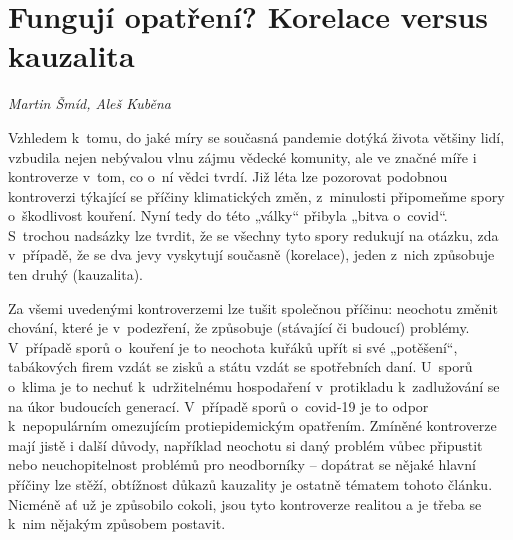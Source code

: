

\chapter{Fungují opatření? Korelace versus kauzalita} \label{Co_na_cem_zavisi}

\textit{Martin Šmíd, Aleš Kuběna}
\vspace{15mm}

Vzhledem k~tomu, do jaké míry se současná pandemie dotýká života většiny lidí, vzbudila nejen nebývalou vlnu zájmu vědecké komunity, ale ve značné míře i kontroverze v~tom, co o~ní vědci tvrdí. Již léta lze pozorovat podobnou kontroverzi týkající se příčiny klimatických změn, z~minulosti připomeňme spory o~škodlivost kouření. Nyní tedy do této „války“ přibyla „bitva o~covid“. S~trochou nadsázky lze tvrdit, že se všechny tyto spory redukují na otázku, zda v~případě, že se dva jevy vyskytují současně (korelace), jeden z~nich způsobuje ten druhý (kauzalita).

Za všemi uvedenými kontroverzemi lze tušit společnou příčinu: neochotu změnit chování, které je v~podezření, že způsobuje (stávající či budoucí) problémy. V~případě sporů o~kouření je to neochota kuřáků upřít si své „potěšení“, tabákových firem vzdát se zisků a státu vzdát se spotřebních daní. U~sporů o~klima je to nechuť k~udržitelnému hospodaření v~protikladu k~zadlužování se na úkor budoucích generací. V~případě sporů o~covid-19 je to odpor k~nepopulárním omezujícím protiepidemickým
opatřením. Zmíněné kontroverze mají jistě i další důvody, například neochotu si daný problém vůbec připustit nebo neuchopitelnost problémů pro neodborníky -- dopátrat se nějaké hlavní příčiny lze stěží, obtížnost důkazů kauzality je ostatně tématem tohoto článku. Nicméně ať už je způsobilo cokoli, jsou tyto kontroverze realitou a je třeba se k~nim nějakým způsobem postavit.

